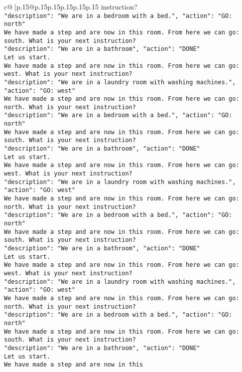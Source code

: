 \documentclass{article}
\begin{document}
{\begin{supertabular}{c@{$\;$}|p{.15\linewidth}@{}p{.15\linewidth}p{.15\linewidth}p{.15\linewidth}p{.15\linewidth}p{.15\linewidth}}
{{{instruction?\\ \tt {"description": "We are in a bedroom with a bed.", "action": "GO: north"}\\ \tt We have made a step and are now in this room. From here we can go: south. What is your next instruction?\\ \tt {"description": "We are in a bathroom", "action": "DONE"}\\ \tt Let us start. \\ \tt We have made a step and are now in this room. From here we can go: west. What is your next instruction?\\ \tt {"description": "We are in a laundry room with washing machines.", "action": "GO: west"}\\ \tt We have made a step and are now in this room. From here we can go: north. What is your next instruction?\\ \tt {"description": "We are in a bedroom with a bed.", "action": "GO: north"}\\ \tt We have made a step and are now in this room. From here we can go: south. What is your next instruction?\\ \tt {"description": "We are in a bathroom", "action": "DONE"}\\ \tt Let us start. \\ \tt We have made a step and are now in this room. From here we can go: west. What is your next instruction?\\ \tt {"description": "We are in a laundry room with washing machines.", "action": "GO: west"}\\ \tt We have made a step and are now in this room. From here we can go: north. What is your next instruction?\\ \tt {"description": "We are in a bedroom with a bed.", "action": "GO: north"}\\ \tt We have made a step and are now in this room. From here we can go: south. What is your next instruction?\\ \tt {"description": "We are in a bathroom", "action": "DONE"}\\ \tt Let us start. \\ \tt We have made a step and are now in this room. From here we can go: west. What is your next instruction?\\ \tt {"description": "We are in a laundry room with washing machines.", "action": "GO: west"}\\ \tt We have made a step and are now in this room. From here we can go: north. What is your next instruction?\\ \tt {"description": "We are in a bedroom with a bed.", "action": "GO: north"}\\ \tt We have made a step and are now in this room. From here we can go: south. What is your next instruction?\\ \tt {"description": "We are in a bathroom", "action": "DONE"}\\ \tt Let us start. \\ \tt We have made a step and are now in this }}}
\end{supertabular}}
\end{document}
